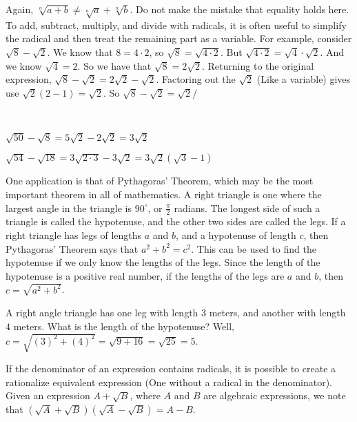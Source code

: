         Again, $\sqrt[n]{a+b} \ne \sqrt[n]{a}+\sqrt[n]{b}$. Do not make the mistake that equality holds here.
        To add, subtract, multiply, and divide with radicals, it is often useful to simplify the radical and then treat the remaining part as a variable. For example, consider $\sqrt{8} - \sqrt{2}$. We know that $8 = 4\cdot 2$, so $\sqrt{8} = \sqrt{4\cdot 2}$. But $\sqrt{4\cdot 2} = \sqrt{4}\cdot \sqrt{2}$. And we know $\sqrt{4} = 2$. So we have that $\sqrt{8} = 2\sqrt{2}$. Returning to the original expression, $\sqrt{8} - \sqrt{2} = 2\sqrt{2} - \sqrt{2}$. Factoring out the $\sqrt{2}$ (Like a variable) gives use $\sqrt{2}(2-1) = \sqrt{2}$. So $\sqrt{8}- \sqrt{2} = \sqrt{2}$/
        \begin{example}
        \
        \begin{enumerate}
        \begin{multicols}{2}
        \item $\sqrt{50} - \sqrt{8} = 5\sqrt{2}- 2\sqrt{2} = 3\sqrt{2}$
        \item $\sqrt{54} - \sqrt{18} = 3\sqrt{2\cdot 3} - 3\sqrt{2}= 3\sqrt{2}(\sqrt{3}-1)$
        \end{multicols}
        \end{enumerate}
        \end{example}
        One application is that of Pythagoras' Theorem, which may be the most important theorem in all of mathematics. A right triangle is one where the largest angle in the triangle is $90^{\circ}$, or $\frac{\pi}{2}$ radians. The longest side of such a triangle is called the hypotenuse, and the other two sides are called the legs. If a right triangle has legs of lengths $a$ and $b$, and a hypotenuse of length $c$, then Pythagoras' Theorem says that $a^2+b^2 = c^2$. This can be used to find the hypotenuse if we only know the lengths of the legs. Since the length of the hypotenuse is a positive real number, if the lengths of the legs are $a$ and $b$, then $c = \sqrt{a^2+b^2}$. 
        \begin{example}
        A right angle triangle has one leg with length $3$ meters, and another with length $4$ meters. What is the length of the hypotenuse? Well, $c = \sqrt{(3)^2+(4)^2} = \sqrt{9+16} = \sqrt{25} = 5$.
        \end{example}
        If the denominator of an expression contains radicals, it is possible to create a rationalize equivalent expression (One without a radical in the denominator). Given an expression $A+\sqrt{B}$, where $A$ and $B$ are algebraic expressions, we note that $(\sqrt{A}+\sqrt{B})(\sqrt{A}-\sqrt{B}) = A-B$. 
